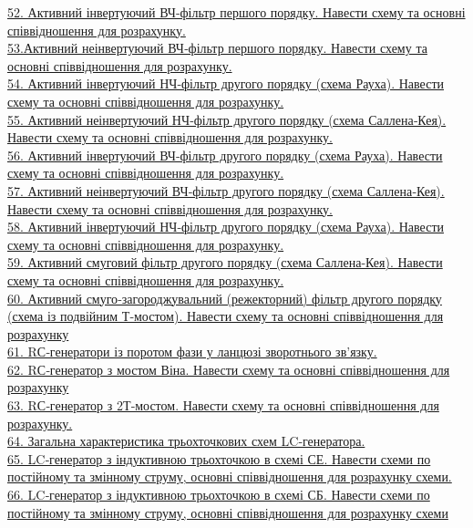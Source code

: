 \documentclass[a4paper,14pt]{extreport}
\begin{document}
\hyperlink{18v}{52. Активний інвертуючий ВЧ‐фільтр першого порядку. Навести схему та основні співвідношення для 
розрахунку.}\\
\hyperlink{19v}{53.Активний  неінвертуючий  ВЧ‐фільтр  першого  порядку.  Навести  схему  та  основні  співвідношення 
для розрахунку.}\\
\hyperlink{20v}{54. Активний  інвертуючий  НЧ‐фільтр  другого  порядку  (схема  Рауха).  Навести  схему  та  основні 
співвідношення для розрахунку.}\\
\hyperlink{21v}{55.  Активний  неінвертуючий  НЧ‐фільтр  другого  порядку  (схема  Саллена‐Кея).  Навести  схему  та 
основні співвідношення для розрахунку.}\\
\hyperlink{22v}{56.  Активний  інвертуючий  ВЧ‐фільтр  другого  порядку  (схема  Рауха).  Навести  схему  та  основні 
співвідношення для розрахунку.}\\
\hyperlink{23v}{57.  Активний неінвертуючий ВЧ‐фільтр другого порядку (схема Саллена‐Кея). Навести схему та основні 
співвідношення для розрахунку. } \\
\hyperlink{24v}{58. Активний  інвертуючий  НЧ‐фільтр  другого  порядку  (схема  Рауха).  Навести  схему  та  основні 
співвідношення для розрахунку.}  \\
\hyperlink{25v}{59. Активний  смуговий  фільтр  другого  порядку  (схема  Саллена‐Кея).  Навести  схему  та  основні 
співвідношення для розрахунку.  }\\
\hyperlink{26v}{60. Активний смуго‐загороджувальний (режекторний) фільтр другого порядку (схема із подвійним Т‐мостом). Навести схему та основні співвідношення для розрахунку}\\
\hyperlink{27v}{61. RС‐генератори із поротом фази у ланцюзі зворотнього зв’язку.}\\
\hyperlink{28v}{62. RС‐генератор з мостом Віна. Навести схему та основні співвідношення для розрахунку}\\
\hyperlink{29v}{63. RС‐генератор з 2Т‐мостом. Навести схему та  основні співвідношення для розрахунку.}\\
\hyperlink{30v}{64.  Загальна характеристика трьохточкових схем LC‐генератора.}\\
\hyperlink{31v}{65. LC‐генератор  з  індуктивною  трьохточкою  в  схемі  СЕ.  Навести  схеми  по  постійному  та  змінному 
струму, основні співвідношення для розрахунку схеми.}\\
\hyperlink{32v}{66. LC‐генератор  з  індуктивною  трьохточкою  в  схемі  СБ.  Навести  схеми  по  постійному  та  змінному 
струму, основні співвідношення для розрахунку схеми }\\
\end{document}
